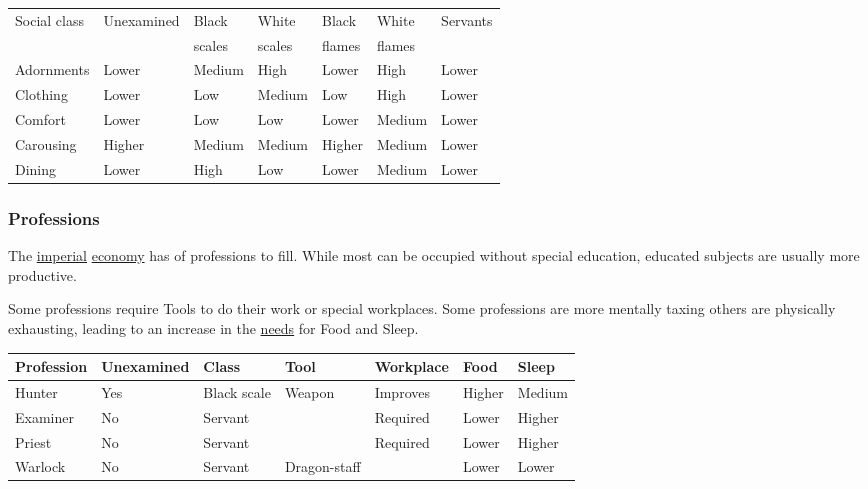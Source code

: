 \begin{longtable}{l l llll l}
	\toprule
	Social class     & Unexamined & Black  & White  & Black  & White  & Servants \\
	                 &            & scales & scales & flames & flames &          \\
	\midrule
	\Gls{Adornments} & Lower      & Medium & High   & Lower  & High   & Lower \\
	\Gls{Clothing}   & Lower      & Low    & Medium & Low    & High   & Lower \\
	\Gls{Comfort}    & Lower      & Low    & Low    & Lower  & Medium & Lower \\
	\Gls{Carousing}  & Higher     & Medium & Medium & Higher & Medium & Lower \\
	\Gls{Dining}     & Lower      & High   & Low    & Lower  & Medium & Lower \\
	\bottomrule
\end{longtable}

\subsubsection{Professions}\label{ch:Tribes:Japanese:Professions}

The \hyperref[ch:Tribes:Japanese]{imperial} \hyperref[ch:Tribes:Japanese:Economy]{economy}
has of professions to fill. 
While most can be occupied without special education,
educated subjects are usually more productive.

Some professions require \glspl{Tool} to do their work or special workplaces.
Some professions are more mentally taxing others are physically exhausting,
leading to an increase in the
\hyperref[ch:World:ch:World:Inhabitants:Sapients:Humans]{needs}
for \gls{Food} and \gls{Sleep}.

\begin{longtable}{lllllll}
	\toprule
	Profession     & Unexamined & Class       & \Gls{Tool}   & Workplace & \Gls{Food} & \Gls{Sleep} \\
	\midrule
	Hunter         & Yes        & Black scale & \Gls{Weapon} & Improves  & Higher     & Medium      \\
	Examiner       & No         & Servant     &              & Required  & Lower      & Higher      \\
	Priest         & No         & Servant     &              & Required  & Lower      & Higher      \\
	Warlock        & No         & Servant     & Dragon-staff &           & Lower      & Lower       \\
	\bottomrule
\end{longtable}
